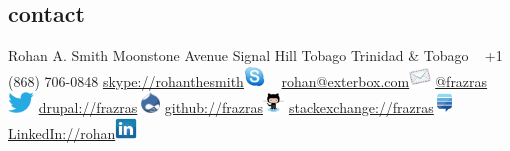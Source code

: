 \documentclass[]{friggeri-cv} %
\begin{document}


\begin{aside} %
\section{contact}
Rohan A. Smith
Moonstone Avenue
Signal Hill
Tobago
Trinidad \& Tobago
~
+1 (868) 706-0848
\href {skype://rohanthesmith}{skype://rohanthesmith}\includegraphics[height=16pt]{images/skype.png}
~
\href{mailto:rohan@exterbox.com}{rohan@exterbox.com}\includegraphics[height=16pt]{email.png}
\href{http://twitter.com/frazras}{@frazras}\includegraphics[height=16pt]{twitter.eps}
\href{http://drupal.org/user/34622}{drupal://frazras}\includegraphics[height=16pt]{druplicon.png}
\href {https://github.com/frazras}{github://frazras}\includegraphics[height=16pt]{octocat.png}
\href{http://stackexchange.com/users/530574/frazras?tab=accounts}{stackexchange://frazras}\includegraphics[height=16pt]{stackexchange.png}
\href {http://jm.linkedin.com/in/rohansmith}{LinkedIn://rohan}\includegraphics[height=16pt]{linkedin.png}

\end{aside}
\end{document}
